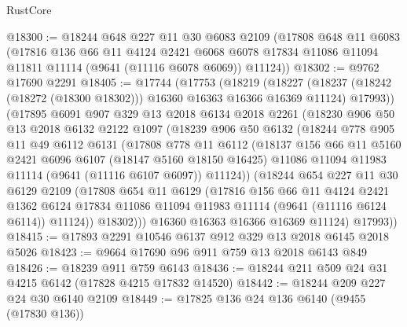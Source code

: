 \begin{lexlean}{RustCore}
\begin{coremodule}
@18300 := @18244
    @648
    @227
    @11
    @30
    @6083
    @2109
    (@17808
      @648
      @11
      @6083
      (@17816
        @136
        @66
        @11
        @4124
        @2421
        @6068
        @6078
        @17834
        @11086
        @11094
        @11811
        @11114
        (@9641 (@11116 @6078 @6069))
        @11124))
@18302 := @9762 @17690 @2291
@18405 := @17744
    (@17753
      (@18219
        (@18227
          (@18237 (@18242 (@18272 (@18300 @18302))) @16360 @16363 @16366 @16369 @11124)
          @17993))
      (@17895
        @6091
        @907
        @329
        @13
        @2018
        @6134
        @2018
        @2261
        (@18230
          @906
          @50
          @13
          @2018
          @6132
          @2122
          @1097
          (@18239
            @906
            @50
            @6132
            (@18244
              @778
              @905
              @11
              @49
              @6112
              @6131
              (@17808
                @778
                @11
                @6112
                (@18137
                  @156
                  @66
                  @11
                  @5160
                  @2421
                  @6096
                  @6107
                  (@18147 @5160 @18150 @16425)
                  @11086
                  @11094
                  @11983
                  @11114
                  (@9641 (@11116 @6107 @6097))
                  @11124))
              (@18244
                @654
                @227
                @11
                @30
                @6129
                @2109
                (@17808
                  @654
                  @11
                  @6129
                  (@17816
                    @156
                    @66
                    @11
                    @4124
                    @2421
                    @1362
                    @6124
                    @17834
                    @11086
                    @11094
                    @11983
                    @11114
                    (@9641 (@11116 @6124 @6114))
                    @11124))
                @18302)))
          @16360
          @16363
          @16366
          @16369
          @11124)
        @17993))
@18415 := @17893 @2291 @10546 @6137 @912 @329 @13 @2018 @6145 @2018 @5026
@18423 := @9664 @17690 @96 @911 @759 @13 @2018 @6143 @849
@18426 := @18239 @911 @759 @6143
@18436 := @18244 @211 @509 @24 @31 @4215 @6142 (@17828 @4215 @17832 @14520)
@18442 := @18244 @209 @227 @24 @30 @6140 @2109
@18449 := @17825 @136 @24 @136 @6140 (@9455 (@17830 @136))

\end{coremodule}
\end{lexlean}
